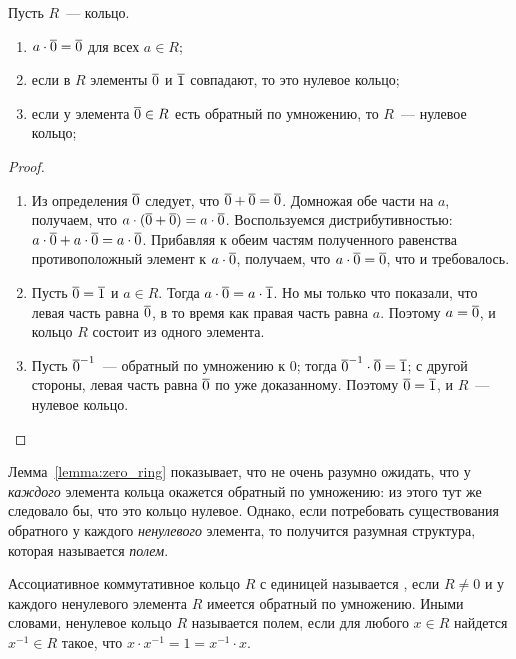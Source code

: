 \begin{lemma}\label{lemma:zero_ring}
Пусть $R$~--- кольцо. 
\begin{enumerate}
\item $a\cdot\overline{0} = \overline{0}$ для всех $a\in R$;
\item если в $R$ элементы $\overline{0}$ и $\overline{1}$ совпадают, то это
  нулевое кольцо;
\item если у элемента $\overline{0}\in R$ есть обратный по умножению, то
  $R$~--- нулевое кольцо;
\end{enumerate}
\end{lemma}
\begin{proof}
\begin{enumerate}
\item Из определения $\overline{0}$ следует, что $\overline{0} + \overline{0} =
  \overline{0}$. Домножая обе части на $a$, получаем, что
  $a\cdot(\overline{0} + \overline{0}) = a\cdot\overline{0}$. Воспользуемся
  дистрибутивностью: $a\cdot\overline{0} + a\cdot\overline{0} =
  a\cdot\overline{0}$. Прибавляя к обеим частям полученного равенства
  противоположный элемент к $a\cdot\overline{0}$, получаем, что
  $a\cdot\overline{0} = \overline{0}$, что и требовалось.
\item Пусть $\overline{0} = \overline{1}$ и $a\in R$. Тогда $a\cdot\overline{0} =
  a\cdot\overline{1}$. Но мы только что показали, что левая часть равна
  $\overline{0}$, в то время как правая часть равна $a$. Поэтому $a=\overline{0}$,
  и кольцо $R$ состоит из одного элемента.
\item Пусть $\overline{0}^{-1}$~--- обратный по умножению к $0$; тогда
  $\overline{0}^{-1}\cdot\overline{0} = \overline{1}$; с другой стороны, левая часть
  равна $\overline{0}$ по уже доказанному. Поэтому $\overline{0}=\overline{1}$, и
  $R$~--- нулевое кольцо.
\end{enumerate}
\end{proof}

Лемма~\ref{lemma:zero_ring} показывает, что не очень разумно ожидать,
что у {\it каждого} элемента кольца окажется обратный по умножению: из
этого тут же следовало бы, что это кольцо нулевое. Однако, если
потребовать существования обратного у каждого {\it ненулевого}
элемента, то получится разумная структура, которая называется
{\it полем}.

\begin{definition}\label{def:field}
Ассоциативное коммутативное кольцо $R$ с единицей называется
, если $R\neq 0$ и у каждого ненулевого
элемента $R$ имеется обратный по умножению. Иными словами, ненулевое
кольцо $R$ называется полем, если для любого $x\in R$ найдется
$x^{-1}\in R$ такое, что $x\cdot x^{-1} = 1 = x^{-1}\cdot x$.
\end{definition}

